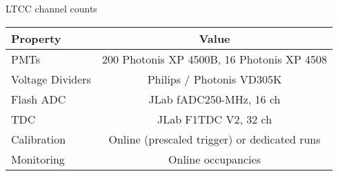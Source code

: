 \documentclass{article}
\begin{document}
\begin{center}
LTCC channel counts \\
\begin{tabular}{| l | c |}
\hline \hline
Property                 & Value \\
\hline
PMTs             &  200 Photonis XP 4500B, 16 Photonis XP 4508    \\
Voltage Dividers & Philips / Photonis VD305K                      \\
Flash ADC        & JLab fADC250-MHz, 16 ch                        \\
TDC              & JLab F1TDC V2, 32 ch                           \\
Calibration      & Online (prescaled trigger) or dedicated runs   \\
Monitoring       & Online occupancies                             \\
\hline \hline
\end{tabular}
\end{center}
\end{document}

